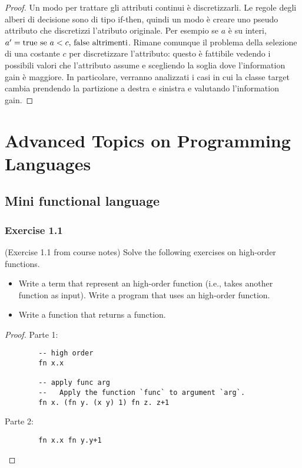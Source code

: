 \documentclass[12pt,a4paper,oneside]{book}
\begin{document}
\begin{proof}
	Un modo per trattare gli attributi continui è discretizzarli. Le regole degli alberi di decisione sono di tipo if-then, quindi un modo è creare uno pseudo attributo che discretizzi l'atributo originale. Per esempio se $a$ è su interi, $a' = \mathrm{true} \text{ se } a < c\text{, } \mathrm{false} \text{ altrimenti}$. Rimane comunque il problema della selezione di una costante $c$ per discretizzare l'attributo: questo è fattibile vedendo i possibili valori che l'attributo assume e scegliendo la soglia dove l'information gain è maggiore. In particolare, verranno analizzati i casi in cui la classe target cambia prendendo la partizione a destra e sinistra e valutando l'information gain.
\end{proof}


\chapter{Advanced Topics on Programming Languages}

\section{Mini functional language}

\subsection{Exercise 1.1}

\begin{exercise}{(Exercise 1.1 from course notes)}
    Solve the following exercises on high-order functions.
    \begin{itemize}
        \item Write a term that represent an high-order function
          (i.e., takes another function as input). Write a program that uses an high-order function.
        \item Write a function that returns a function.
    \end{itemize}

	\begin{proof}
	    Parte 1:
	    \begin{verbatim}
	    -- high order
	    fn x.x
	
	    -- apply func arg
	    --   Apply the function `func` to argument `arg`.
	    fn x. (fn y. (x y) 1) fn z. z+1
	    \end{verbatim}
	
	    Parte 2:
	    \begin{verbatim}
	    fn x.x fn y.y+1
	    \end{verbatim}
	\end{proof}
\end{exercise}
\end{document}
